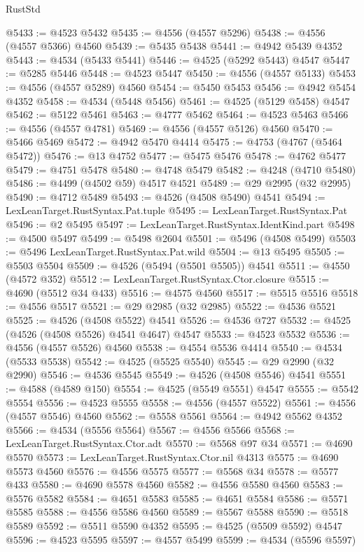 \begin{lexlean}{RustStd}
\begin{coremodule}
@5433 := @4523 @5432
@5435 := @4556 (@4557 @5296)
@5438 := @4556 (@4557 @5366) @4560
@5439 := @5435 @5438
@5441 := @4942 @5439 @4352
@5443 := @4534 (@5433 @5441)
@5446 := @4525 (@5292 @5443) @4547
@5447 := @5285 @5446
@5448 := @4523 @5447
@5450 := @4556 (@4557 @5133)
@5453 := @4556 (@4557 @5289) @4560
@5454 := @5450 @5453
@5456 := @4942 @5454 @4352
@5458 := @4534 (@5448 @5456)
@5461 := @4525 (@5129 @5458) @4547
@5462 := @5122 @5461
@5463 := @4777 @5462
@5464 := @4523 @5463
@5466 := @4556 (@4557 @4781)
@5469 := @4556 (@4557 @5126) @4560
@5470 := @5466 @5469
@5472 := @4942 @5470 @4414
@5475 := @4753 (@4767 (@5464 @5472))
@5476 := @13 @4752
@5477 := @5475 @5476
@5478 := @4762 @5477
@5479 := @4751 @5478
@5480 := @4748 @5479
@5482 := @4248 (@4710 @5480)
@5486 := @4499 (@4502 @59) @4517 @4521
@5489 := @29 @2995 (@32 @2995)
@5490 := @4712 @5489
@5493 := @4526 (@4508 @5490) @4541
@5494 := LexLeanTarget.RustSyntax.Pat.tuple
@5495 := LexLeanTarget.RustSyntax.Pat
@5496 := @2 @5495
@5497 := LexLeanTarget.RustSyntax.IdentKind.part
@5498 := @4500 @5497
@5499 := @5498 @2604
@5501 := @5496 (@4508 @5499)
@5503 := @5496 LexLeanTarget.RustSyntax.Pat.wild
@5504 := @13 @5495
@5505 := @5503 @5504
@5509 := @4526 (@5494 (@5501 @5505)) @4541
@5511 := @4550 (@4572 @352)
@5512 := LexLeanTarget.RustSyntax.Ctor.closure
@5515 := @4690 (@5512 @34 @433)
@5516 := @4575 @4560
@5517 := @5515 @5516
@5518 := @4556 @5517
@5521 := @29 @2985 (@32 @2985)
@5522 := @4536 @5521
@5525 := @4526 (@4508 @5522) @4541
@5526 := @4536 @727
@5532 := @4525 (@4526 (@4508 @5526) @4541 @4647) @4547
@5533 := @4523 @5532
@5536 := @4556 (@4557 @5526) @4560
@5538 := @4554 @5536 @4414
@5540 := @4534 (@5533 @5538)
@5542 := @4525 (@5525 @5540)
@5545 := @29 @2990 (@32 @2990)
@5546 := @4536 @5545
@5549 := @4526 (@4508 @5546) @4541
@5551 := @4588 (@4589 @150)
@5554 := @4525 (@5549 @5551) @4547
@5555 := @5542 @5554
@5556 := @4523 @5555
@5558 := @4556 (@4557 @5522)
@5561 := @4556 (@4557 @5546) @4560
@5562 := @5558 @5561
@5564 := @4942 @5562 @4352
@5566 := @4534 (@5556 @5564)
@5567 := @4556 @5566
@5568 := LexLeanTarget.RustSyntax.Ctor.adt
@5570 := @5568 @97 @34
@5571 := @4690 @5570
@5573 := LexLeanTarget.RustSyntax.Ctor.nil @4313
@5575 := @4690 @5573 @4560
@5576 := @4556 @5575
@5577 := @5568 @34
@5578 := @5577 @433
@5580 := @4690 @5578 @4560
@5582 := @4556 @5580 @4560
@5583 := @5576 @5582
@5584 := @4651 @5583
@5585 := @4651 @5584
@5586 := @5571 @5585
@5588 := @4556 @5586 @4560
@5589 := @5567 @5588
@5590 := @5518 @5589
@5592 := @5511 @5590 @4352
@5595 := @4525 (@5509 @5592) @4547
@5596 := @4523 @5595
@5597 := @4557 @5499
@5599 := @4534 (@5596 @5597)

\end{coremodule}
\end{lexlean}
